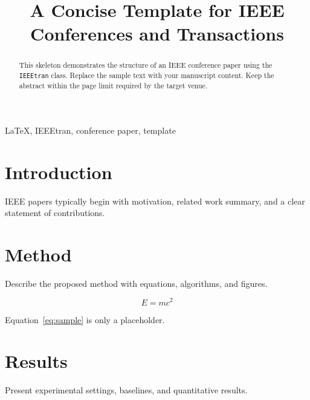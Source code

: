 \documentclass[conference]{IEEEtran}
\begin{document}
\title{A Concise Template for IEEE Conferences and Transactions}

\author{
\and
{}
}

\maketitle

\begin{abstract}
This skeleton demonstrates the structure of an IEEE conference paper using the \texttt{IEEEtran} class. Replace the sample text with your manuscript content. Keep the abstract within the page limit required by the target venue.
\end{abstract}

\begin{IEEEkeywords}
LaTeX, IEEEtran, conference paper, template
\end{IEEEkeywords}

\IEEEpeerreviewmaketitle

\section{Introduction}
IEEE papers typically begin with motivation, related work summary, and a clear statement of contributions.

\section{Method}
Describe the proposed method with equations, algorithms, and figures.

\begin{equation}
    E = mc^2
    \label{eq:sample}
\end{equation}

Equation~\eqref{eq:sample} is only a placeholder.

\section{Results}
Present experimental settings, baselines, and quantitative results.
\end{document}
